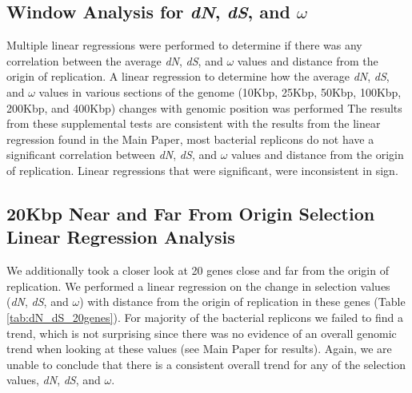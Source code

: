 \documentclass[11pt]{article}
\newcommand{\dn}{\textit{dN}\xspace}
\newcommand{\ds}{\textit{dS}\xspace}
\begin{document}
\subsection{Window Analysis for \dn, \ds, and $\omega$}
Multiple linear regressions were performed to determine if there was any correlation between the average \dn, \ds, and $\omega$ values and distance from the origin of replication.
A linear regression to determine how the average \dn, \ds, and $\omega$ values in various sections of the genome (10Kbp, 25Kbp, 50Kbp, 100Kbp, 200Kbp, and 400Kbp) changes with genomic position was performed %
The results from these supplemental tests are consistent with the results from the linear regression found in the Main Paper, most bacterial replicons do not have a significant correlation between \dn, \ds, and $\omega$ values and distance from the origin of replication.
Linear regressions that were significant, were inconsistent in sign.


\subsection{20Kbp Near and Far From Origin Selection Linear Regression Analysis}
\label{20Kbp_near_far}
We additionally took a closer look at 20 genes close and far from the origin of replication.
We performed a linear regression on the change in selection values (\dn, \ds, and $\omega$) with distance from the origin of replication in these genes (Table \ref{tab:dN_dS_20genes}).
For majority of the bacterial replicons we failed to find a trend, which is not surprising since there was no evidence of an overall genomic trend when looking at these values (see Main Paper for results).
Again, we are unable to conclude that there is a consistent overall trend for any of the selection values, \dn, \ds, and $\omega$.
\end{document}
